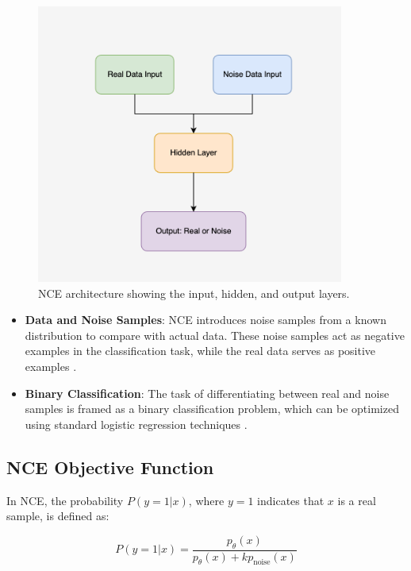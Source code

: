 \begin{figure}[H]
    \centering
    \includegraphics[width=0.9\textwidth]{./Images/NCE_structure.jpg}
    \caption{NCE architecture showing the input, hidden, and output layers.}
    \label{fig:NCE_structure}
\end{figure}

\begin{itemize}
    \item \textbf{Data and Noise Samples}: NCE introduces noise samples from a known distribution to compare with actual data. These noise samples act as negative examples in the classification task, while the real data serves as positive examples \citep{10.48550/arxiv.1711.00658}.
    \item \textbf{Binary Classification}: The task of differentiating between real and noise samples is framed as a binary classification problem, which can be optimized using standard logistic regression techniques \citep{10.18653/v1/e17-2003}.
\end{itemize}

\subsection{NCE Objective Function}
In NCE, the probability \( P(y = 1 | x) \), where \( y = 1 \) indicates that \( x \) is a real sample, is defined as:

\begin{equation}
P(y = 1 | x) = \frac{p_{\theta}(x)}{p_{\theta}(x) + k p_{\text{noise}}(x)}
\end{equation}

